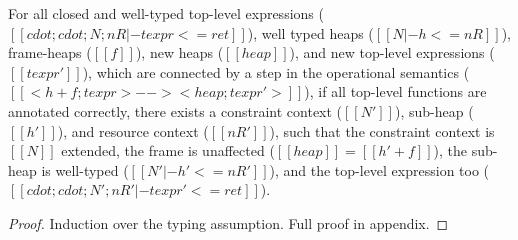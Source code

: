\begin{theorem}
For all closed and well-typed top-level expressions
($[[ cdot ; cdot ; N ; nR |- texpr <= ret ]]$),
well typed heaps ($[[ N |- h <= nR ]]$),
frame-heaps ($[[ f ]]$),
new heaps ($[[ heap ]]$),
and new top-level expressions ($[[ texpr' ]]$),
which are connected by a step in the operational semantics
($[[ < h + f ; texpr > -->  < heap ; texpr' > ]]$),
if all top-level functions are annotated correctly,
there exists a constraint context ($[[ N' ]]$),
sub-heap ($[[ h' ]]$),
and resource context ($[[ nR' ]]$),
such that the constraint context is $[[ N ]]$ extended,
the frame is unaffected ($[[ heap ]] = [[ h' + f ]]$),
the sub-heap is well-typed ($[[ N' |- h' <= nR' ]]$),
and the top-level expression too
($[[ cdot ; cdot ; N' ; nR' |- texpr' <= ret ]]$).
\end{theorem}

\begin{proof}
Induction over the typing assumption. Full proof in appendix.
\end{proof}

